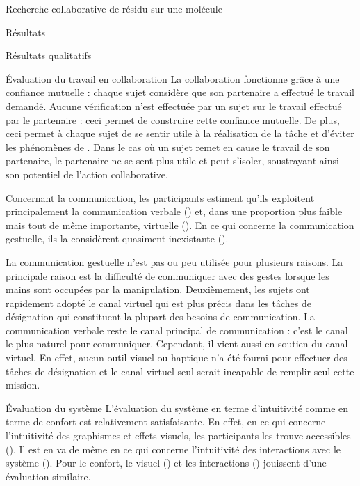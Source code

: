 \documentclass[myfrancais]{mythesis}
\begin{document}
\begin{mychapter}{Recherche collaborative de résidu sur une molécule}
\begin{mysection}{Résultats}
\begin{mysubsection}{Résultats qualitatifs}
\begin{mysubsubsection}{Évaluation du travail en collaboration}
					La collaboration fonctionne grâce à une confiance mutuelle : chaque sujet considère que son partenaire a effectué le travail demandé.
					Aucune vérification n'est effectuée par un sujet sur le travail effectué par le partenaire : ceci permet de construire cette confiance mutuelle.
					De plus, ceci permet à chaque sujet de se sentir utile à la réalisation de la tâche et d'éviter les phénomènes de .
					Dans le cas où un sujet remet en cause le travail de son partenaire, le partenaire ne se sent plus utile et peut s'isoler, soustrayant ainsi son potentiel de l'action collaborative.

					Concernant la communication, les participants estiment qu'ils exploitent principalement la communication verbale () et, dans une proportion plus faible mais tout de même importante, virtuelle ().
					En ce qui concerne la communication gestuelle, ils la considèrent quasiment inexistante ().

					La communication gestuelle n'est pas ou peu utilisée pour plusieurs raisons.
					La principale raison est la difficulté de communiquer avec des gestes lorsque les mains sont occupées par la manipulation.
					Deuxièmement, les sujets ont rapidement adopté le canal virtuel qui est plus précis dans les tâches de désignation qui constituent la plupart des besoins de communication.
					La communication verbale reste le canal principal de communication : c'est le canal le plus naturel pour communiquer.
					Cependant, il vient aussi en soutien du canal virtuel.
					En effet, aucun outil visuel ou haptique n'a été fourni pour effectuer des tâches de désignation et le canal virtuel seul serait incapable de remplir seul cette mission.
				\end{mysubsubsection}
				\begin{mysubsubsection}{Évaluation du système}
					L'évaluation du système en terme d'intuitivité comme en terme de confort est relativement satisfaisante.
					En effet, en ce qui concerne l'intuitivité des graphismes et effets visuels, les participants les trouve accessibles ().
					Il est en va de même en ce qui concerne l'intuitivité des interactions avec le système ().
					Pour le confort, le visuel () et les interactions () jouissent d'une évaluation similaire.


\end{mysubsubsection}
\end{mysubsection}
\end{mysection}
\end{mychapter}
\end{document}
